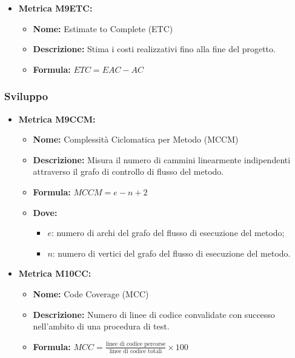 \begin{itemize}
    \item \textbf{Metrica M9ETC:}
          \begin{itemize}
              \item \textbf{Nome:} Estimate to Complete (ETC)
              \item \textbf{Descrizione:} Stima i costi realizzativi fino alla fine del progetto.
              \item \textbf{Formula:} $ETC = EAC - AC$
          \end{itemize}
\end{itemize}


\subsubsection{Sviluppo}
\begin{itemize}
    \item \textbf{Metrica M9CCM:}
          \begin{itemize}
              \item \textbf{Nome:} Complessità Ciclomatica per Metodo (MCCM)
              \item \textbf{Descrizione:} Misura il numero di cammini linearmente indipendenti attraverso il grafo di controllo di flusso del metodo.
              \item \textbf{Formula:} $MCCM = e - n + 2$
              \item \textbf{Dove:}
                    \begin{itemize}
                        \item $e$: numero di archi del grafo del flusso di esecuzione del metodo;
                        \item $n$: numero di vertici del grafo del flusso di esecuzione del metodo.
                    \end{itemize}
          \end{itemize}

    \item \textbf{Metrica M10CC:}
          \begin{itemize}
              \item \textbf{Nome:} Code Coverage (MCC)
              \item \textbf{Descrizione:} Numero di linee di codice convalidate con successo nell'ambito di una procedura di test.
              \item \textbf{Formula:} $MCC = \frac{\text{linee di codice percorse}}{\text{linee di codice totali}} \times 100$
          \end{itemize}


\end{itemize}
